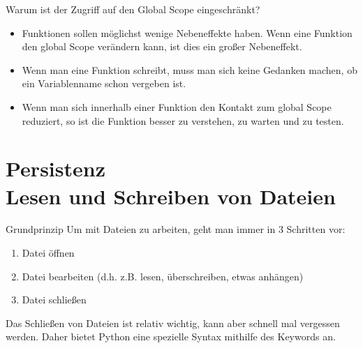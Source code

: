 \begin{frame}
	
\begin{block}{Warum ist der Zugriff auf den Global Scope eingeschränkt?}
	\pause 
	\begin{itemize}[<+->]
		\item Funktionen sollen möglichst wenige Nebeneffekte haben. Wenn eine Funktion den global Scope verändern kann, ist dies ein großer Nebeneffekt. 
		\item Wenn man eine Funktion schreibt, muss man sich keine Gedanken machen, ob ein Variablenname schon vergeben ist. 
		\item Wenn man sich innerhalb einer Funktion den Kontakt zum global Scope reduziert, so ist die Funktion besser zu verstehen, zu warten und zu testen. 
	\end{itemize}
\end{block}
	
	
\end{frame}



\section{Persistenz \\ \footnotesize Lesen und Schreiben von Dateien}

\begin{frame}
	
\begin{block}{Grundprinzip}
\vspace{2pt}
Um mit Dateien zu arbeiten, geht man immer in 3 Schritten vor:
\pause 
\begin{enumerate}
	\item<2-> Datei öffnen 
	\item<3-> Datei bearbeiten (d.h. z.B. lesen, überschreiben, etwas anhängen)
	\item<4-> Datei schließen
\end{enumerate}
\pause \pause \pause
Das Schließen von Dateien ist relativ wichtig, kann aber schnell mal vergessen werden. Daher bietet Python eine spezielle Syntax mithilfe des Keywords  an. 
\end{block}
\end{frame}


